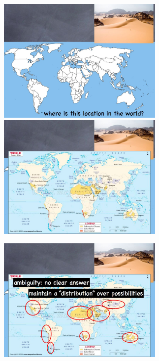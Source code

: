 \begin{figure}
\centerline{
\mbox{\includegraphics[width=3.20in]{figures/8_loc5.jpg}}
\mbox{\includegraphics[width=3.20in]{figures/8_loc6.jpg}}
}
\end{figure}


\begin{figure}
\centerline{
\mbox{\includegraphics[width=3.20in]{figures/8_loc7.jpg}}
}
\end{figure}


